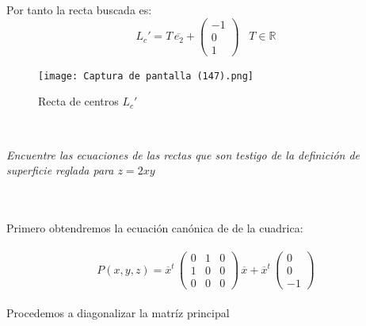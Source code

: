 \documentclass[11pt,letterpaper]{article}
\newcommand{\R}{\mathbb{R}}
\begin{document}
    Por tanto la recta buscada es:\,\\
    \begin{equation*}
        L_{c}'=T\,\overline{e_2}+\begin{pmatrix}
                -1 \\
                0\\
                1
                \end{pmatrix}\,\,\,\,\,T\in \R
    \end{equation*}
\begin{figure}
    \centering
    \texttt{[image: Captura de pantalla (147).png]}
    \caption{Recta de centros $L_{c}'$}
    \label{Cono rebanado}
     \end{figure}\,\\
     \newpage
    \begin{tcolorbox}[
	title = \textcolor{black}{\textcolor{white}{Problema 3}},]
\textit{Encuentre las ecuaciones de las rectas que son testigo de la definici\'on de superficie reglada
para $z=2xy$
}
\end{tcolorbox}\,\\
\,\\
Primero obtendremos la ecuaci\'on can\'onica de de la cuadrica:\,\\
\,\\
\begin{equation*}
        P(x,y,z)=\overline{x}^t\,\begin{pmatrix}
                0 & 1 & 0\\
                1& 0 & 0\\
                0 & 0 & 0
                \end{pmatrix}\,\overline{x}+\overline{x}^t\,
                \begin{pmatrix}
                0 \\
                0\\
                -1
                \end{pmatrix}
    \end{equation*}\,\\
     Procedemos a diagonalizar la matr\'iz principal\,\\
    \,\\
\end{document}
